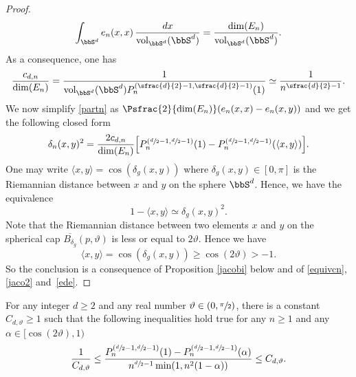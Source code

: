 \begin{proof}
\begin{equation*}
\int_{\bbS^d}e_n(x,x)\,\frac{dx}{\operatorname{vol}_{\bbS^d}(\bbS^d)}=\frac{\dim(E_n)}{\operatorname{vol}_{\bbS^d}(\bbS^d)}.
\end{equation*}
As a consequence, one has
\begin{equation}\label{equivcn}
\frac{c_{d,n}}{\dim(E_n)}=\frac{1}{\operatorname{vol}_{\bbS^d}(\bbS^d) P_n^{(\sfrac{d}{2}-1,\sfrac{d}{2}-1)}(1)}\simeq \frac{1}{n^{\sfrac{d}{2}-1}}.
\end{equation}
We now simplify \eqref{partn} as $\Psfrac{2}{\dim(E_n)}(e_n(x,x)-e_n(x,y))$ and we get the following closed form
\begin{equation}\label{jaco2}
\delta_n(x,y)^2 =\frac{2c_{d,n}}{\dim(E_n)}\Bigl[P_n^{\left(\sfrac{d}{2}-1,\sfrac{d}{2}-1 \right)} (1)-P_n^{\left(\sfrac{d}{2}-1,\sfrac{d}{2}-1 \right)} (\langle x,y\rangle)\Bigr].
	\end{equation}
One may write $\langle x,y\rangle =\cos(\delta_g(x,y))$ where $\delta_g(x,y)\in [0,\pi]$ is the Riemannian distance between $x$ and $y$ on the sphere $\bbS^d$. Hence, we have the equivalence
\begin{equation}\label{ede}
1-\langle x,y\rangle\simeq \delta_{g}(x,y)^2.\end{equation}
Note that the Riemannian distance between two elements $x$ and $y$ on the spherical cap $\overline{B_{\delta_g}}(p,\vartheta)$ is less or equal to $2\vartheta$. Hence we have
\begin{equation*}
\langle x,y\rangle=\cos(\delta_g(x,y))\geq \cos(2\vartheta)>-1.
\end{equation*}
So the conclusion is a consequence of Proposition \ref{jacobi} below and of \eqref{equivcn}, \eqref{jaco2} and~\eqref{ede}.
\end{proof}

\begin{prop}\label{jacobi}
For any integer $d\geq 2$ and any real number $\vartheta \in (0,\sfrac{\pi}{2})$, there is a constant $C_{d,\vartheta}\geq 1$ such that the following inequalities hold true for any $n\geq 1$ and any $\alpha \in [\cos(2\vartheta),1)$
\begin{equation}\label{jacobi2}
\frac{1}{C_{d,\vartheta}} \leq \frac{P_{n}^{(\sfrac{d}{2}-1,\sfrac{d}{2}-1)}(1)-P_{n}^{(\sfrac{d}{2}-1,\sfrac{d}{2}-1)}(\alpha)}{n^{\sfrac{d}{2}-1}\min(1,n^2(1-\alpha))}\leq C_{d,\vartheta}.
\end{equation}
\end{prop}

